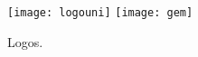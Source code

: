 \begin{exampletwoup}
\begin{figure}[ht!]
\centering
\texttt{[image: logouni]}
\texttt{[image: gem]}
\caption{Logos.}
\end{figure}
\end{exampletwoup}
